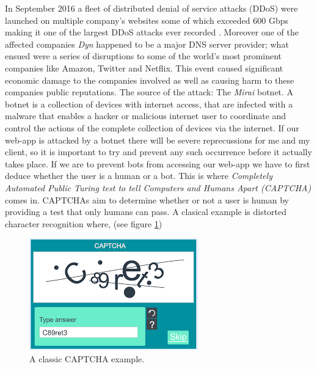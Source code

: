 In September 2016 a fleet of distributed denial of service 
attacks (DDoS) were launched on multiple company's websites 
some of which exceeded 600 Gbps making it one of the largest 
DDoS attacks ever recorded \cite{mirai}. Moreover one of the 
affected companies \textit{Dyn} happened to be a major DNS
server provider; what ensued were a series of disruptions to 
some of the world's most prominent companies like Amazon, 
Twitter and Netflix. This event caused significant economic 
damage to the companies involved as well as causing harm to 
these companies public reputations. The source of the attack:
The \textit{Mirai} botnet. A botnet is a collection of 
devices with internet access, that are infected with a malware
that enables a hacker or malicious internet user to coordinate
and control the actions of the complete collection of devices
via the internet. If our web-app is attacked by a botnet 
there will be severe reprecussions for me and my client, so 
it is important to try and prevent any such occurrence before
it actually takes place. If we are to prevent bots from 
accessing our web-app we have to first deduce whether the user
is a human or a bot. This is where \textit{Completely
Automated Public Turing test to tell Computers and Humans
Apart (CAPTCHA)} comes in. CAPTCHAs aim to determine whether
or not a user is human by providing a test that only humans 
can pass. A clasical example is distorted character 
recognition where, (see figure \ref{fig:captcha})
\\ \vspace{0.2cm}

\begin{figure}[h]
  \centering
  \includegraphics[scale=0.75]{Images/Captcha.png}
  \caption{A classic CAPTCHA example.}
  \label{fig:captcha}
\end{figure}

